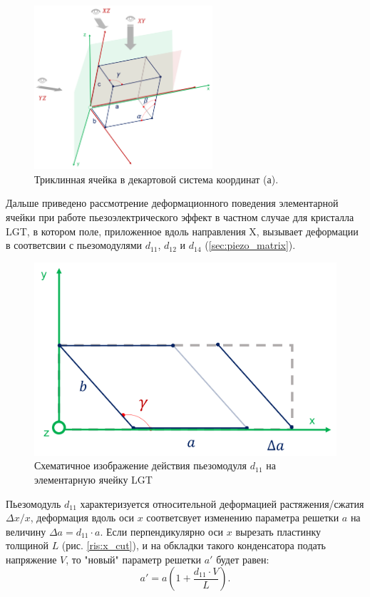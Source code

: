 \begin{figure}[H]
  \centering
  \includegraphics[width=0.59\textwidth]{images/piezo_deformation_general.png}
  \caption{Триклинная ячейка в декартовой система координат (а).}
  \label{ris:piezo_deformation_general}
\label{ris:}
\end{figure}


Дальше приведено рассмотрение деформационного поведения элементарной ячейки при работе пьезоэлектрического
эффект в частном случае для кристалла LGT, в котором поле, приложенное вдоль направления X,
вызывает деформации в соответсвии с пьезомодулями $d_{11}$, $d_{12}$ и $d_{14}$ (\ref{sec:piezo_matrix}).

\begin{figure}[H]
  \centering
  \includegraphics[width=.5\textwidth]{images/d11.png}
  \caption{Схематичное изображение действия пьезомодуля $d_{11}$ на элементарную ячейку LGT}
  \label{ris:d11}
\end{figure}

Пьезомодуль $d_{11}$ характеризуется относительной деформацией растяжения/сжатия $\Delta x/x$, деформация вдоль оси $x$
соответсвует изменению параметра решетки $a$ на величину $\Delta a = d_{11}\cdot a$. %
Если перпендикулярно оси $x$ вырезать пластинку толщиной $L$
(рис. \ref{ris:x_cut}), и на обкладки такого конденсатора подать напряжение
$V$, то "новый" параметр решетки $a{'}$ будет равен:
\begin{equation}
   a{'}  = a \left(1+\frac{d_{11}\cdot V }{L}\right).
   \label{eq:a_deformed}
\end{equation}

